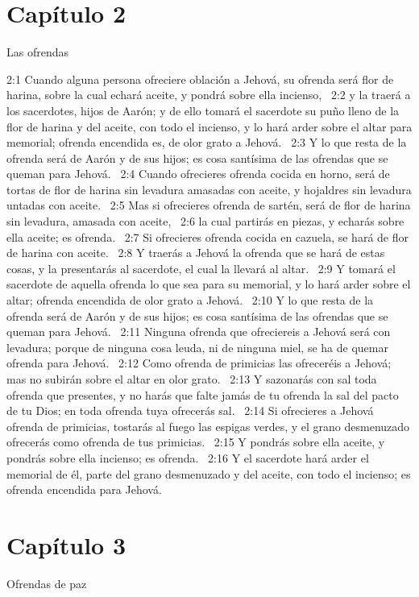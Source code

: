 \section*{Capítulo 2}
Las ofrendas 

2:1 Cuando alguna persona ofreciere oblación a Jehová, su ofrenda será flor de harina, sobre la cual echará aceite, y pondrá sobre ella incienso,  
2:2 y la traerá a los sacerdotes, hijos de Aarón; y de ello tomará el sacerdote su puño lleno de la flor de harina y del aceite, con todo el incienso, y lo hará arder sobre el altar para memorial; ofrenda encendida es, de olor grato a Jehová.  
2:3 Y lo que resta de la ofrenda será de Aarón y de sus hijos; es cosa santísima de las ofrendas que se queman para Jehová.  
2:4 Cuando ofrecieres ofrenda cocida en horno, será de tortas de flor de harina sin levadura amasadas con aceite, y hojaldres sin levadura untadas con aceite.  
2:5 Mas si ofrecieres ofrenda de sartén, será de flor de harina sin levadura, amasada con aceite,  
2:6 la cual partirás en piezas, y echarás sobre ella aceite; es ofrenda.  
2:7 Si ofrecieres ofrenda cocida en cazuela, se hará de flor de harina con aceite.  
2:8 Y traerás a Jehová la ofrenda que se hará de estas cosas, y la presentarás al sacerdote, el cual la llevará al altar.  
2:9 Y tomará el sacerdote de aquella ofrenda lo que sea para su memorial, y lo hará arder sobre el altar; ofrenda encendida de olor grato a Jehová.  
2:10 Y lo que resta de la ofrenda será de Aarón y de sus hijos; es cosa santísima de las ofrendas que se queman para Jehová.  
2:11 Ninguna ofrenda que ofreciereis a Jehová será con levadura; porque de ninguna cosa leuda, ni de ninguna miel, se ha de quemar ofrenda para Jehová.  
2:12 Como ofrenda de primicias las ofreceréis a Jehová; mas no subirán sobre el altar en olor grato.  
2:13 Y sazonarás con sal toda ofrenda que presentes, y no harás que falte jamás de tu ofrenda la sal del pacto de tu Dios; en toda ofrenda tuya ofrecerás sal.  
2:14 Si ofrecieres a Jehová ofrenda de primicias, tostarás al fuego las espigas verdes, y el grano desmenuzado ofrecerás como ofrenda de tus primicias.  
2:15 Y pondrás sobre ella aceite, y pondrás sobre ella incienso; es ofrenda.  
2:16 Y el sacerdote hará arder el memorial de él, parte del grano desmenuzado y del aceite, con todo el incienso; es ofrenda encendida para Jehová.  
\section*{Capítulo 3}
Ofrendas de paz  

